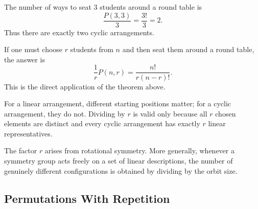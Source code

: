\begin{center}
\end{center}

\begin{examplebox}[title={Three students around a table}]
The number of ways to seat $3$ students around a round table is
\[
\frac{P(3,3)}{3}=\frac{3!}{3}=2.
\]
Thus there are exactly two cyclic arrangements.
\end{examplebox}

\begin{examplebox}[title={Choosing and seating $r$ students around a round table}]
If one must choose $r$ students from $n$ and then seat them around a round table, the answer is
\[
\frac{1}{r}P(n,r)=\frac{n!}{r(n-r)!}.
\]
This is the direct application of the theorem above.
\end{examplebox}

\begin{commonmistake}[title={Linear order versus cyclic order}]
For a linear arrangement, different starting positions matter; for a cyclic arrangement, they do not. Dividing by $r$ is valid only because all $r$ chosen elements are distinct and every cyclic arrangement has exactly $r$ linear representatives.
\end{commonmistake}

\begin{extension}[title={Division by symmetry}]
The factor $r$ arises from rotational symmetry. More generally, whenever a symmetry group acts freely on a set of linear descriptions, the number of genuinely different configurations is obtained by dividing by the orbit size.
\end{extension}

\subsection{Permutations With Repetition}

